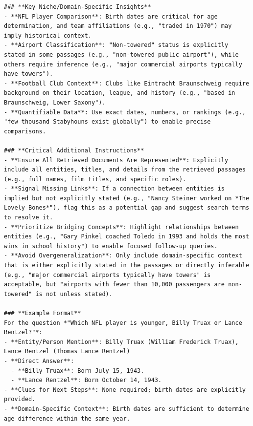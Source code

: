 \begin{instructbox}
\begin{lstlisting}[breakindent=0pt, breaklines=true, breakatwhitespace=true, frame=single, backgroundcolor=\color{blue!10}]
### **Key Niche/Domain-Specific Insights**  
- **NFL Player Comparison**: Birth dates are critical for age determination, and team affiliations (e.g., "traded in 1970") may imply historical context.  
- **Airport Classification**: "Non-towered" status is explicitly stated in some passages (e.g., "non-towered public airport"), while others require inference (e.g., "major commercial airports typically have towers").  
- **Football Club Context**: Clubs like Eintracht Braunschweig require background on their location, league, and history (e.g., "based in Braunschweig, Lower Saxony").  
- **Quantifiable Data**: Use exact dates, numbers, or rankings (e.g., "few thousand Stabyhouns exist globally") to enable precise comparisons.  

### **Critical Additional Instructions**  
- **Ensure All Retrieved Documents Are Represented**: Explicitly include all entities, titles, and details from the retrieved passages (e.g., full names, film titles, and specific roles).  
- **Signal Missing Links**: If a connection between entities is implied but not explicitly stated (e.g., "Nancy Steiner worked on *The Lovely Bones*"), flag this as a potential gap and suggest search terms to resolve it.  
- **Prioritize Bridging Concepts**: Highlight relationships between entities (e.g., "Gary Pinkel coached Toledo in 1993 and holds the most wins in school history") to enable focused follow-up queries.  
- **Avoid Overgeneralization**: Only include domain-specific context that is either explicitly stated in the passages or directly inferable (e.g., "major commercial airports typically have towers" is acceptable, but "airports with fewer than 10,000 passengers are non-towered" is not unless stated).  

### **Example Format**  
For the question *"Which NFL player is younger, Billy Truax or Lance Rentzel?"*:  
- **Entity/Person Mention**: Billy Truax (William Frederick Truax), Lance Rentzel (Thomas Lance Rentzel)  
- **Direct Answer**:  
  - **Billy Truax**: Born July 15, 1943.  
  - **Lance Rentzel**: Born October 14, 1943.  
- **Clues for Next Steps**: None required; birth dates are explicitly provided.  
- **Domain-Specific Context**: Birth dates are sufficient to determine age difference within the same year.  


\end{lstlisting}
\end{instructbox}
